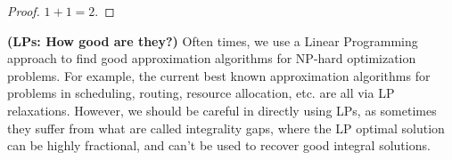 \documentclass[solution,addpoints,12pt]{exam}
\begin{document}
\begin{questions}
\begin{parts}
  \begin{solution}
  \begin{proof}
  $1 + 1 = 2$.
  \end{proof}
  \end{solution}


\end{parts}



\question[20] \textbf{(LPs: How good are they?)} Often times, we use a Linear Programming approach to find good approximation algorithms for NP-hard optimization problems. For example, the current best known approximation algorithms for problems in scheduling, routing, resource allocation, etc. are all via LP relaxations. However, we should be careful in directly using LPs, as sometimes they suffer from what are called integrality gaps, where the LP optimal solution can be highly fractional, and can't be used to recover good integral solutions.

\end{questions}
\end{document}
